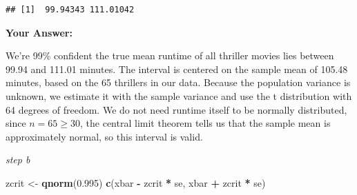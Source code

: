 \documentclass[
]{article}
\newenvironment{Shaded}{\begin{snugshade}}{\end{snugshade}}
\newcommand{\AttributeTok}[1]{\textcolor[rgb]{0.13,0.29,0.53}{#1}}
\newcommand{\ConstantTok}[1]{\textcolor[rgb]{0.56,0.35,0.01}{#1}}
\newcommand{\DecValTok}[1]{\textcolor[rgb]{0.00,0.00,0.81}{#1}}
\newcommand{\FloatTok}[1]{\textcolor[rgb]{0.00,0.00,0.81}{#1}}
\newcommand{\FunctionTok}[1]{\textcolor[rgb]{0.13,0.29,0.53}{\textbf{#1}}}
\newcommand{\NormalTok}[1]{#1}
\newcommand{\OtherTok}[1]{\textcolor[rgb]{0.56,0.35,0.01}{#1}}
\newcommand{\SpecialCharTok}[1]{\textcolor[rgb]{0.81,0.36,0.00}{\textbf{#1}}}
\newcommand{\StringTok}[1]{\textcolor[rgb]{0.31,0.60,0.02}{#1}}
\begin{document}
\begin{Shaded}
\end{Shaded}

\begin{verbatim}
## [1]  99.94343 111.01042
\end{verbatim}

\textbf{Your Answer:}

We're 99\% confident the true mean runtime of all thriller movies lies
between 99.94 and 111.01 minutes. The interval is centered on the sample
mean of 105.48 minutes, based on the 65 thrillers in our data. Because
the population variance is unknown, we estimate it with the sample
variance and use the t distribution with 64 degrees of freedom. We do
not need runtime itself to be normally distributed, since
\(n = 65 \geq 30\), the central limit theorem tells us that the sample
mean is approximately normal, so this interval is valid.

\emph{step b}

\begin{Shaded}
\begin{Highlighting}[]
\NormalTok{zcrit }\OtherTok{\textless{}{-}} \FunctionTok{qnorm}\NormalTok{(}\FloatTok{0.995}\NormalTok{)}
\FunctionTok{c}\NormalTok{(xbar }\SpecialCharTok{{-}}\NormalTok{ zcrit }\SpecialCharTok{*}\NormalTok{ se, xbar }\SpecialCharTok{+}\NormalTok{ zcrit }\SpecialCharTok{*}\NormalTok{ se)}
\end{Highlighting}
\end{Shaded}
\end{document}
